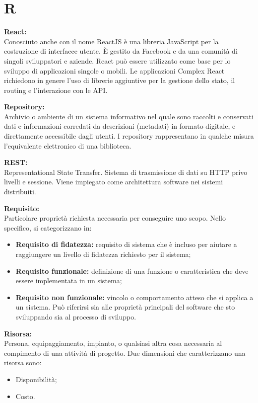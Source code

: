 \documentclass[a4paper, oneside, openany, dvipsnames, table]{article}
\begin{document}
\newpage
\section{R}
\textbf{React:}\\	Conosciuto anche con il nome ReactJS è una libreria JavaScript per la costruzione di interfacce utente. È gestito da Facebook e da una comunità di singoli sviluppatori e aziende. React può essere utilizzato come base per lo sviluppo di applicazioni singole o mobili. Le applicazioni Complex React richiedono in genere l'uso di librerie aggiuntive per la gestione dello stato, il routing e l'interazione con le API.
 
\textbf{Repository:}\\	Archivio o ambiente di un sistema informativo nel quale sono raccolti e conservati dati e informazioni corredati da descrizioni (metadati) in formato digitale, e direttamente accessibile dagli utenti. I repository rappresentano in qualche misura l’equivalente elettronico di una biblioteca.

\textbf{REST:}\\
Representational State Transfer. Sistema di trasmissione di dati su HTTP privo livelli e sessione. Viene impiegato come architettura software nei sistemi distribuiti.

\textbf{Requisito:}\\	Particolare proprietà richiesta necessaria per conseguire uno scopo. Nello specifico, si categorizzano in:
\begin{itemize}
	\item \textbf{Requisito di fidatezza:} requisito di sistema che è incluso per aiutare a raggiungere un livello di fidatezza richiesto per il sistema;
	\item \textbf{Requisito funzionale:} definizione di una funzione o caratteristica che deve essere implementata in un sistema;
	\item \textbf{Requisito non funzionale:} vincolo o comportamento atteso che si applica a un sistema. Può riferirsi sia alle proprietà principali del software che sto sviluppando sia al processo di sviluppo.
\end{itemize}

\textbf{Risorsa:}\\	Persona, equipaggiamento, impianto, o qualsiasi altra cosa necessaria al compimento di una attività di progetto. Due dimensioni che caratterizzano una risorsa sono:
\begin{itemize}
\item Disponibilità;
\item Costo.
\end{itemize} 
\end{document}
